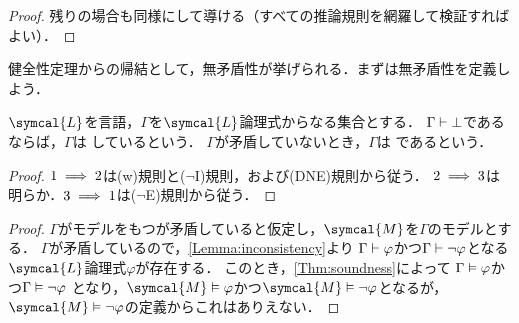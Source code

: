 \begin{proof}
	残りの場合も同様にして導ける（すべての推論規則を網羅して検証すればよい）．
\end{proof}

健全性定理からの帰結として，無矛盾性が挙げられる．まずは無矛盾性を定義しよう．

\begin{Def} \label{Def:consistency}
	\(\symcal{L}\)を言語，\(\Gamma\)を\(\symcal{L}\)論理式からなる集合とする．
	\(\Gamma \vdash \bot\)であるならば，\(\Gamma\)は%
	しているという．
	\(\Gamma\)が矛盾していないとき，\(\Gamma\)は
	であるという．
\end{Def}


\begin{proof}
	\(1 \implies 2\)は(w)規則と(\(\lnot\)I)規則，および(DNE)規則から従う．
	\(2 \implies 3\)は明らか．\(3 \implies 1\)は(\(\lnot\)E)規則から従う．
\end{proof}


\begin{proof}
	\(\Gamma\)がモデルをもつが矛盾していると仮定し，\(\symcal{M}\)を\(\Gamma\)のモデルとする．
	\(\Gamma\)が矛盾しているので，\cref{Lemma:inconsistency}より
	\(\Gamma \vdash \varphi\)かつ\(\Gamma \vdash \lnot \varphi\)となる\(\symcal{L}\)論理式\(\varphi\)が存在する．
	このとき，\cref{Thm:soundness}によって
	\(\Gamma \vDash \varphi\)かつ\(\Gamma \vDash \lnot \varphi\)
	となり，\(\symcal{M} \satisfy \varphi\)かつ\(\symcal{M} \satisfy \lnot \varphi\)となるが，
	\(\symcal{M} \satisfy \lnot \varphi\)の定義からこれはありえない．
\end{proof}

